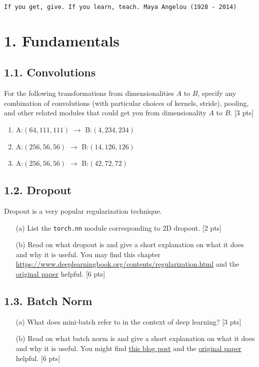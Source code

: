 \documentclass[12pt,letterpaper]{article}
\begin{document}
\begin{center}
\texttt{If you get, give. If you learn, teach. Maya Angelou (1928 - 2014)}
\end{center}


\section*{1. Fundamentals}


\subsection*{1.1. Convolutions}

For the following transformations from dimensionalities $A$ to $B$, specify any combination of convolutions (with particular choices of kernels, stride), pooling, and other related modules that could get you from dimensionality $A$ to $B$. [3 pts]
\begin{enumerate}
    \item A:$(64,111,111)$ $\to$ B:$(4,234,234)$
    \item A:$(256,56,56)$ $\to$ B:$(14,126,126)$  
    \item A:$(256,56,56)$ $\to$ B:$(42,72,72)$
\end{enumerate}
              
\subsection*{1.2. Dropout}
Dropout is a very popular regularization technique. 
\begin{itemize}
    \item[(a)]  List the \texttt{torch.nn} module corresponding to 2D dropout. [2 pts]
    \newline
    \item[(b)] Read on what dropout is and give a short explanation on what it does and why it is useful. You may find this chapter  \href{https://www.deeplearningbook.org/contents/regularization.html}{https://www.deeplearningbook.org/contents/regularization.html} and the \href{http://jmlr.org/papers/volume15/srivastava14a/srivastava14a.pdf}{original paper} helpful. [6 pts]
    

  
\end{itemize}
\subsection*{1.3. Batch Norm}
\begin{itemize}
    \item[(a)]  What does mini-batch refer to in the context of deep learning? [3 pts]
    \newline
    
    \item[(b)] Read on what batch norm  is and give a short explanation on what it does and why it is useful. You might find \href{https://towardsdatascience.com/batch-normalization-in-neural-networks-1ac91516821c}{this blog post} and the
    \href{https://arxiv.org/pdf/1502.03167.pdf}{original paper} helpful. [6 pts] 
\end{itemize}
\end{document}
